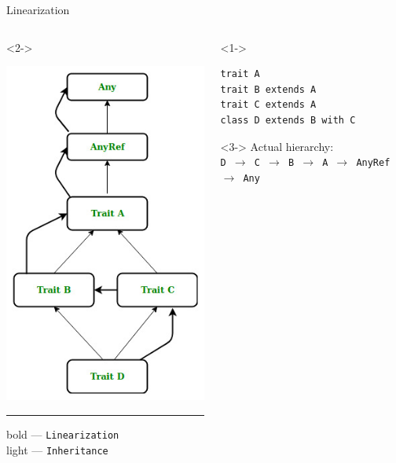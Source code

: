 \documentclass[aspectratio=169]{beamer}
\begin{document}
\begin{frame}[fragile]{Linearization}
  \begin{columns}
    \begin{column}{0.5\textwidth}
      \begin{onlyenv}<2->
        \begin{center}
          \includegraphics[scale=0.3]{linear}
        \end{center}
        \hrule\vspace{3pt}
        \noindent\tiny bold --- \texttt{Linearization} \\ \vspace{-1em}
        \noindent\tiny light --- \texttt{Inheritance}
      \end{onlyenv}
    \end{column}
    \begin{column}{0.5\textwidth}
      \begin{onlyenv}<1->
        \begin{lstlisting}[style=scala]
trait A
trait B extends A
trait C extends A
class D extends B with C
        \end{lstlisting} 
      \end{onlyenv} 
      \vspace{2em}
      \begin{onlyenv}<3->
        Actual hierarchy: \\
        \texttt{D $\rightarrow$ C $\rightarrow$ B $\rightarrow$ A $\rightarrow$ AnyRef $\rightarrow$ Any}
      \end{onlyenv}
    \end{column}
  \end{columns}
\end{frame}
\end{document}

